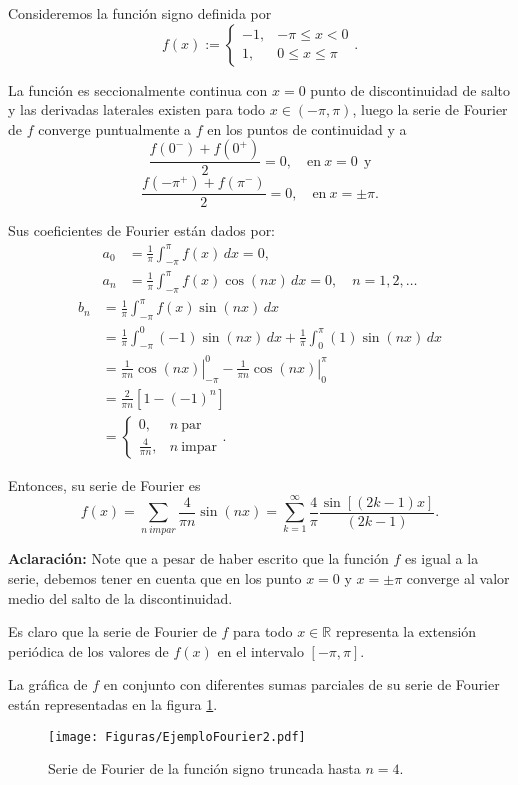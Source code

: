 \begin{ejemplo} \label{Signo}
Consideremos la función signo  definida por
$$f(x) := \left\{ \begin{array}{cc}
     -1,& - \pi \leq x < 0  \\
     1,&   0 \leq x \leq \pi
\end{array} \right. .$$

La función es seccionalmente continua con $x = 0$ punto de discontinuidad de salto y las derivadas laterales existen para todo $x \in (-\pi,\pi)$, luego la serie de Fourier de $f$ converge puntualmente a $f$ en los puntos de continuidad y a 
$$\frac{f(0^-) + f(0^+)}{2} = 0, \quad \mbox{en} ~ x = 0 ~~\mbox{y}$$
$$\frac{f(-\pi^+) + f(\pi^-)}{2} = 0, \quad \mbox{en} ~ x = \pm \pi. $$

Sus coeficientes de Fourier están dados por:
\begin{align*}
    a_0 &= \frac{1}{\pi} \int_{-\pi}^{\pi} f(x) \,dx = 0 , \\
    a_n &= \frac{1}{\pi} \int_{-\pi}^{\pi} f(x) \cos(n x)\,dx = 0, \quad n = 1,2,\dots
\end{align*}
\begin{align*}
     b_n &= \frac{1}{\pi} \int_{-\pi}^{\pi} f(x) \sin(nx) \,dx \\
     &= \frac{1}{\pi} \int_{-\pi}^0 (-1) \sin(nx)\,dx + \frac{1}{\pi} \int_{0}^{\pi} (1) \sin(nx) \,dx \\
     &= \left.  \frac{1}{\pi n} \cos(nx) \right|_{-\pi}^0 - \left. \frac{1}{\pi n} \cos(nx) \right|_{0}^{\pi} \\
     &= \frac{2}{\pi n} [1 - (-1)^n] \\
     &= \left\{ \begin{array}{cl}
         0, & n ~\mbox{par}  \\
         \frac{4}{\pi n}, &  n ~\mbox{impar}
     \end{array} \right. .
\end{align*}

Entonces, su serie de Fourier es 
$$f(x) =  \sum_{n ~impar} \frac{4}{\pi n} \sin(nx) = \sum_{k=1}^{\infty} \frac{4}{\pi} \frac{\sin[(2k-1)x]}{ (2k-1)}.$$

\textbf{Aclaración:} Note que a pesar de haber escrito que la función $f$ es igual a la serie, debemos tener en cuenta que en los punto $x = 0$ y $x = \pm \pi$ converge al valor medio del salto de la discontinuidad.

Es claro que la serie de Fourier de $f$ para todo $x\in \mathbb{R}$ representa la extensión periódica de los valores de $f(x)$ en el intervalo $[-\pi,\pi]$.

La gráfica de $f$ en conjunto con diferentes sumas parciales de su serie de Fourier están representadas en la figura \ref{fig:EjemploFourier2}.

\begin{figure}[H]
    \centering
    \texttt{[image: Figuras/EjemploFourier2.pdf]}
    \caption{Serie de Fourier de la función signo truncada hasta $n = 4$.}
     \label{fig:EjemploFourier2}
\end{figure}

\end{ejemplo}


